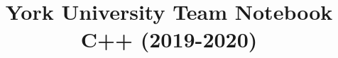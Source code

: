 \documentclass[11pt]{article}
\title{\vspace{-4ex}\Large{York University Team Notebook C++ (2019-2020)}}
\author{}
\date{}
\begin{document}
\begin{landscape}
\begin{multicols}{2}

\maketitle
\vspace{-13ex}
\tableofcontents
\pagestyle{fancy}



\end{multicols}
\end{landscape}
\end{document}
